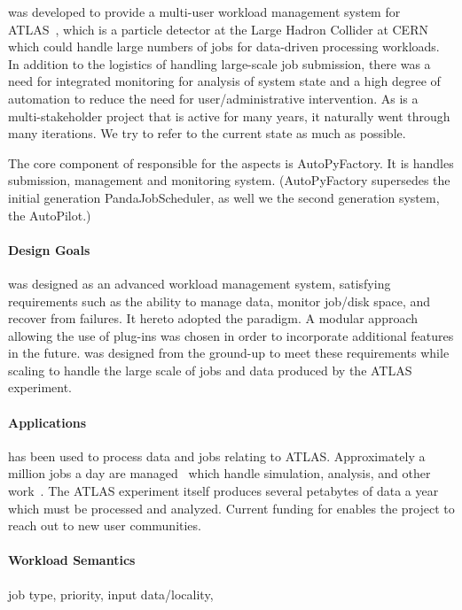 \documentclass{sig-alternate}
\begin{document}
\panda was developed to provide a multi-user workload management system for
ATLAS~\cite{aad2008atlas}, which is a particle detector at the Large Hadron
Collider at CERN which could handle large numbers of jobs for data-driven
processing workloads.
In addition to the logistics of handling large-scale job submission, there was
a need for integrated monitoring for analysis of system state and a high degree
of automation to reduce the need for user/administrative intervention.
As \panda is a multi-stakeholder project that is active for many years, it
naturally went through many iterations.
We try to refer to the current state as much as possible.

The core component of \panda responsible for the \pilot aspects is
AutoPyFactory\cite{Caballero:2012ka}.
It is handles \pilot submission, management and monitoring system.
(AutoPyFactory supersedes the initial generation PandaJobScheduler, as well we
the second generation system, the AutoPilot.)

\paragraph{Design Goals}
\panda was designed as an advanced workload management system,
satisfying requirements such as the ability
to manage data, monitor job/disk space, and recover from failures.
It hereto adopted the \pilot paradigm.
A modular approach allowing the use of plug-ins was chosen in order
to incorporate additional features in the future.
\panda was designed from the ground-up to meet these requirements
while scaling to handle the large scale of jobs and data produced
by the ATLAS experiment.

\paragraph{Applications}
\panda has been used to process data and jobs relating to ATLAS.  Approximately
a million jobs a day are managed~\cite{pandapresentation2013-06}
which handle simulation, analysis, and other work~\cite{maeno_pd2p:_2012}.
The ATLAS experiment itself produces several petabytes of data a year
which must be processed and analyzed.
Current funding for \panda enables the project to reach out to new user
communities.

\paragraph{Workload Semantics}
job type, priority, input data/locality,
\end{document}
